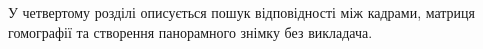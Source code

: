 У четвертому розділі описується пошук відповідності між кадрами,
матриця гомографії та створення панорамного
знімку без викладача.
